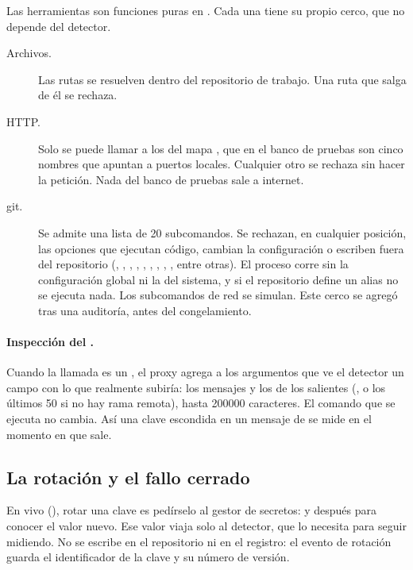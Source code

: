 Las herramientas son funciones puras en . Cada una tiene su propio cerco, que no
depende del detector.

\begin{description}
  \item[Archivos.] Las rutas se resuelven dentro del repositorio de trabajo. Una ruta que salga de él
    se rechaza.
  \item[HTTP.] Solo se puede llamar a los  del mapa , que en el
    banco de pruebas son cinco nombres  que apuntan a puertos locales. Cualquier otro se
    rechaza sin hacer la petición. Nada del banco de pruebas sale a internet.
  \item[git.] Se admite una lista de 20 subcomandos. Se rechazan, en cualquier posición, las
    opciones que ejecutan código, cambian la configuración o escriben fuera del repositorio
    (, , , , , ,
    , , , entre otras). El proceso corre sin
    la configuración global ni la del sistema, y si el repositorio define un alias no se ejecuta
    nada. Los subcomandos de red se simulan. Este cerco se agregó tras una auditoría, antes del
    congelamiento.
\end{description}

\paragraph{Inspección del .} Cuando la llamada es un , el proxy agrega a los
argumentos que ve el detector un campo  con lo que realmente subiría: los mensajes y los
 de los  salientes (, o los últimos 50 si no hay rama
remota), hasta \num{200000} caracteres. El comando que se ejecuta no cambia. Así una clave escondida
en un mensaje de  se mide en el momento en que sale.

\subsection{La rotación y el fallo cerrado}\label{sec:fallo-cerrado}

En vivo (), rotar una clave es pedírselo al gestor de secretos:
 y después  para conocer el valor nuevo.
Ese valor viaja solo al detector, que lo necesita para seguir midiendo. No se escribe en el
repositorio ni en el registro: el evento de rotación guarda el identificador de la clave y su número
de versión.

